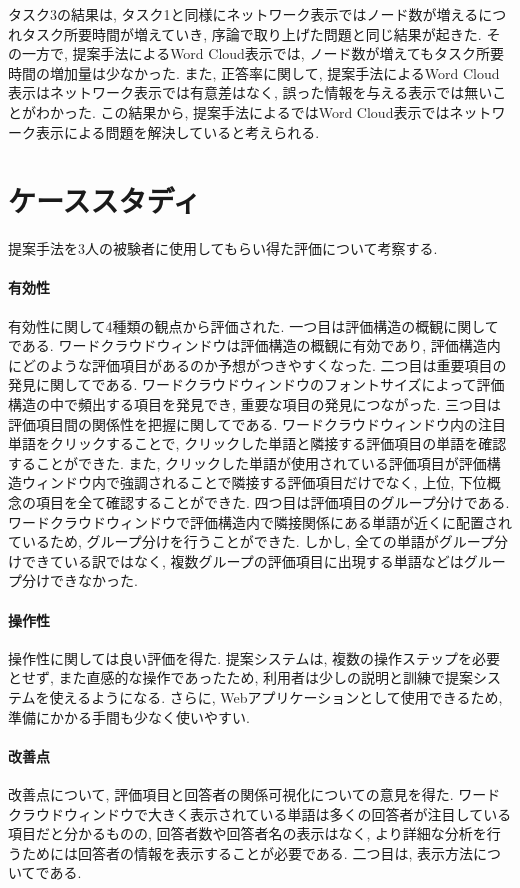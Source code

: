 \documentclass[syuuron]{kuee}
\begin{document}
	タスク3の結果は, タスク1と同様にネットワーク表示ではノード数が増えるにつれタスク所要時間が増えていき, 序論で取り上げた問題と同じ結果が起きた. 
	その一方で, 提案手法によるWord Cloud表示では, ノード数が増えてもタスク所要時間の増加量は少なかった. 
	また, 正答率に関して, 提案手法によるWord Cloud表示はネットワーク表示では有意差はなく, 誤った情報を与える表示では無いことがわかった. 
	この結果から, 提案手法によるではWord Cloud表示ではネットワーク表示による問題を解決していると考えられる. 
	
	\section{ケーススタディ}%
	提案手法を3人の被験者に使用してもらい得た評価について考察する. 
		\paragraph{有効性}
		有効性に関して4種類の観点から評価された. 
		一つ目は評価構造の概観に関してである. 
		ワードクラウドウィンドウは評価構造の概観に有効であり, 評価構造内にどのような評価項目があるのか予想がつきやすくなった. 
		二つ目は重要項目の発見に関してである. 
		ワードクラウドウィンドウのフォントサイズによって評価構造の中で頻出する項目を発見でき, 
		重要な項目の発見につながった. 
		三つ目は評価項目間の関係性を把握に関してである. 
		ワードクラウドウィンドウ内の注目単語をクリックすることで, クリックした単語と隣接する評価項目の単語を確認することができた. 
		また, クリックした単語が使用されている評価項目が評価構造ウィンドウ内で強調されることで隣接する評価項目だけでなく, 
		上位, 下位概念の項目を全て確認することができた. 
		四つ目は評価項目のグループ分けである. 
		ワードクラウドウィンドウで評価構造内で隣接関係にある単語が近くに配置されているため, グループ分けを行うことができた. 
		しかし, 全ての単語がグループ分けできている訳ではなく, 複数グループの評価項目に出現する単語などはグループ分けできなかった. 
		
		\paragraph{操作性}
		操作性に関しては良い評価を得た. 
		提案システムは, 複数の操作ステップを必要とせず, また直感的な操作であったため, 利用者は少しの説明と訓練で提案システムを使えるようになる. 
		さらに, Webアプリケーションとして使用できるため, 準備にかかる手間も少なく使いやすい. 
		
		\paragraph{改善点}
		改善点について, 評価項目と回答者の関係可視化についての意見を得た. 
		ワードクラウドウィンドウで大きく表示されている単語は多くの回答者が注目している項目だと分かるものの, 
		回答者数や回答者名の表示はなく, より詳細な分析を行うためには回答者の情報を表示することが必要である. 
		二つ目は, 表示方法についてである. 
		
\end{document}
